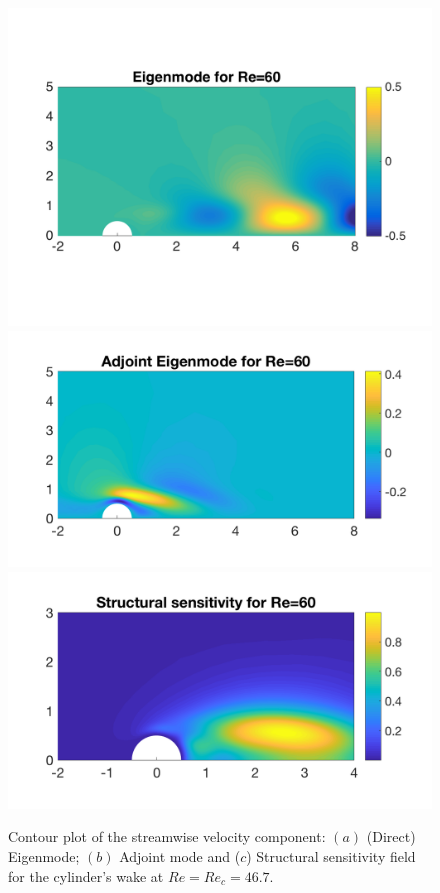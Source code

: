 \documentclass[twocolumn,10pt]{asme2ej}
\begin{document}
\begin{figure}
\includegraphics[width=.9 \linewidth]{Cylinder_EigenModeRe60_AdaptD.png}
\includegraphics[width=.9 \linewidth]{Cylinder_EigenModeAdjRe60.png}
\includegraphics[width=.9 \linewidth]{Cylinder_SensitivityRe60.png}
\caption{Contour plot of the streamwise velocity component: $(a)$ (Direct) Eigenmode; $(b)$ Adjoint mode and ($c$) Structural sensitivity field for the cylinder's wake at $Re=Re_c = 46.7$.}
\label{fig:Eigenmode}
\end{figure}
\end{document}
